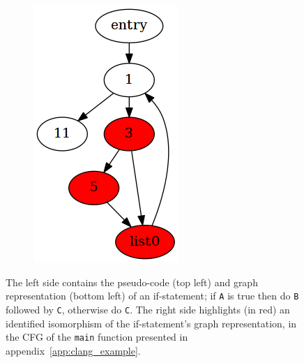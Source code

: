 \begin{figure}[htbp]
\begin{subfigure}[ht]{0.10\textwidth}
	\end{subfigure}
	\enskip
	\begin{subfigure}[ht]{0.18\textwidth}
		\includegraphics[width=\textwidth]{inc/6_design/example1_highlight.png}
	\end{subfigure}
	\caption{The left side contains the pseudo-code (top left) and graph representation (bottom left) of an if-statement; if \texttt{A} is true then do \texttt{B} followed by \texttt{C}, otherwise do \texttt{C}. The right side highlights (in red) an identified isomorphism of the if-statement's graph representation, in the CFG of the \texttt{main} function presented in appendix~\ref{app:clang_example}.}
	\label{fig:representation_and_identification_of_primitive}
\end{figure}


